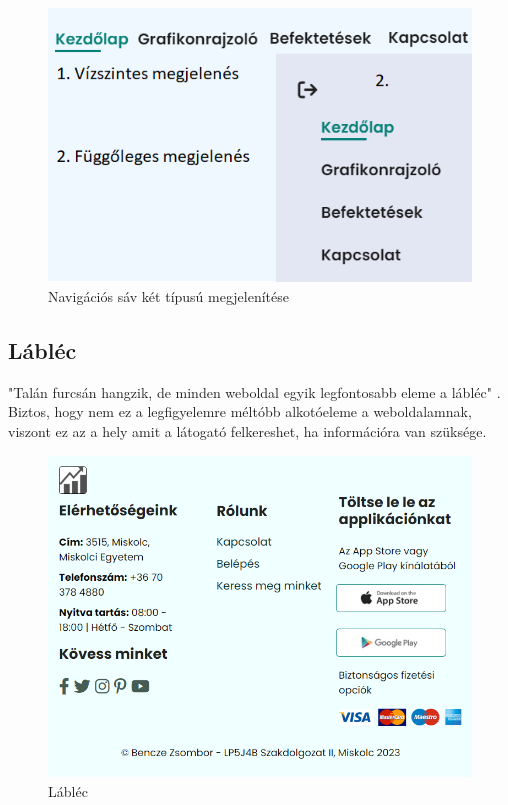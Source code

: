 \begin{figure}[h]
\centering
\includegraphics[scale=0.5]{images/navbar.png}
\caption{Navigációs sáv két típusú megjelenítése}
\label{fig:navbar}
\end{figure}

\subsection{Lábléc}

"Talán furcsán hangzik, de minden weboldal egyik legfontosabb eleme a lábléc" \cite{contact}. Biztos, hogy nem ez a legfigyelemre méltóbb alkotóeleme a weboldalamnak, viszont ez az a hely amit a látogató felkereshet, ha információra van szüksége.

\begin{figure}[h]
\centering
\includegraphics[scale=0.5]{images/footer.png}
\caption{Lábléc}
\end{figure}

